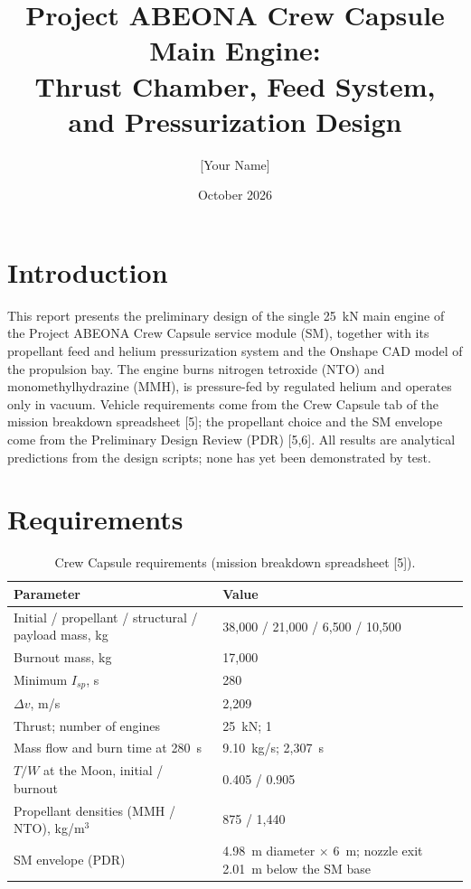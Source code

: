 \documentclass[10pt]{article}
\title{Project ABEONA Crew Capsule Main Engine:\\Thrust Chamber, Feed System, and Pressurization Design}
\author{[Your Name]}
\date{October 2026}
\begin{document}
\maketitle

\section{Introduction}
This report presents the preliminary design of the single 25~kN main engine of the Project ABEONA Crew Capsule service
module (SM), together with its propellant feed and helium pressurization system and the Onshape CAD model of the
propulsion bay. The engine burns nitrogen tetroxide (NTO) and monomethylhydrazine (MMH), is pressure-fed by regulated
helium and operates only in vacuum. Vehicle requirements come from the Crew Capsule tab of the mission breakdown
spreadsheet [5]; the propellant choice and the SM envelope come from the Preliminary Design Review (PDR) [5,6]. All
results are analytical predictions from the design scripts; none has yet been demonstrated by test.

\section{Requirements}
\begin{table}[H]\centering\small\caption{Crew Capsule requirements (mission breakdown spreadsheet [5]).}\label{tab:req}
\begin{tabular}{lp{8.2cm}}\toprule
Parameter & Value \\\midrule
Initial / propellant / structural / payload mass, kg & 38{,}000 / 21{,}000 / 6{,}500 / 10{,}500 \\
Burnout mass, kg & 17{,}000 \\
Minimum $I_{sp}$, s & 280 \\
$\Delta v$, m/s & 2{,}209 \\
Thrust; number of engines & 25~kN; 1 \\
Mass flow and burn time at 280~s & 9.10~kg/s; 2{,}307~s \\
$T/W$ at the Moon, initial / burnout & 0.405 / 0.905 \\
Propellant densities (MMH / NTO), kg/m$^3$ & 875 / 1{,}440 \\
SM envelope (PDR) & 4.98~m diameter $\times$ 6~m; nozzle exit 2.01~m below the SM base \\
\bottomrule\end{tabular}\end{table}
\end{document}
